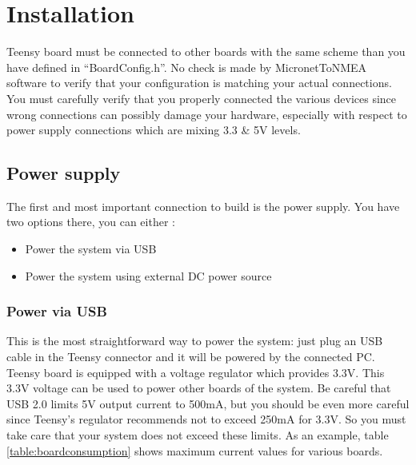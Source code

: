 \documentclass{report}
\begin{document}
\chapter{Installation}

Teensy board must be connected to other boards with the same scheme than you have defined in “BoardConfig.h”. No check is made by MicronetToNMEA software to verify that your configuration is matching your actual connections. You must carefully verify that you properly connected the various devices since wrong connections can possibly damage your hardware, especially with respect to power supply connections which are mixing 3.3 \& 5V levels.

\section{Power supply}

The first and most important connection to build is the power supply. You have two options there, you can either :

\begin{itemize}
	\item Power the system via USB
	\item Power the system using external DC power source
\end{itemize}

\subsection{Power via USB}

This is the most straightforward way to power the system: just plug an USB cable in the Teensy connector and it will be powered by the connected PC. Teensy board is equipped with a voltage regulator which provides 3.3V. This 3.3V voltage can be used to power other boards of the system.
Be careful that USB 2.0 limits 5V output current to 500mA, but you should be even more careful since Teensy's regulator recommends not to exceed 250mA for 3.3V. So you must take care that your system does not exceed these limits.
As an example, table \ref{table:boardconsumption} shows maximum current values for various boards.
\end{document}
